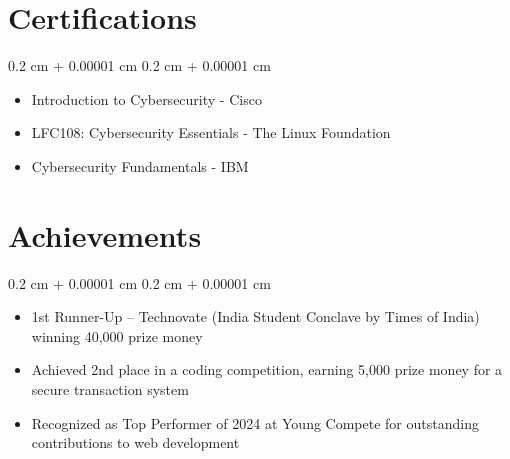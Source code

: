 \documentclass[10pt, letterpaper]{article}
\newenvironment{highlights}{
    \begin{itemize}[
        topsep=0.10 cm,
        parsep=0.10 cm,
        partopsep=0pt,
        itemsep=0pt,
        leftmargin=0.4 cm + 10pt
    ]
}{
    \end{itemize}
} %
\newenvironment{onecolentry}{
    \begin{adjustwidth}{
        0.2 cm + 0.00001 cm
    }{
        0.2 cm + 0.00001 cm
    }
}{
    \end{adjustwidth}
} %
\let\hrefWithoutArrow\href
\renewcommand{\href}[2]{\hrefWithoutArrow{#1}{\ifthenelse{\equal{#2}{}}{ }{#2 }\raisebox{.15ex}{\footnotesize \faExternalLink*}}}
\begin{document}
    \section{Certifications}
    \begin{onecolentry}
        \begin{highlights}
            \item Introduction to Cybersecurity - Cisco \href{https://www.credly.com/badges/a7c00b29-a55e-42e6-8fa6-90174db3e9d7/public_url}{\textcolor{primaryColor}{\small [View Certificate]}}
            \item LFC108: Cybersecurity Essentials - The Linux Foundation \href{https://www.credly.com/badges/50d5dd68-4744-4b04-b719-3f0658e97910/public_url}{\textcolor{primaryColor}{\small [View Certificate]}}
            \item Cybersecurity Fundamentals - IBM \href{https://www.credly.com/badges/0e03da41-f13a-4a06-9835-caf8a48ac10d/public_url}{\textcolor{primaryColor}{\small [View Certificate]}}
        \end{highlights}
    \end{onecolentry}
    \section{Achievements}
    \begin{onecolentry}
        \begin{highlights}
            \item 1st Runner-Up – Technovate (India Student Conclave by Times of India) winning 40,000 prize money
            \item Achieved 2nd place in a coding competition, earning 5,000 prize money for a secure transaction system
            \item Recognized as Top Performer of 2024 at Young Compete for outstanding contributions to web development
        \end{highlights}
    \end{onecolentry}
\end{document}

